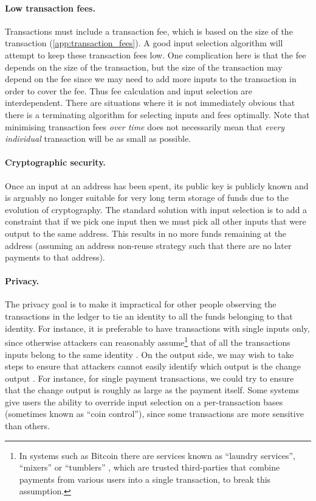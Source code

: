 \documentclass{article}
\theoremstyle{definition}{
  \newtheorem{lemma}{Lemma}[section] %
  \newtheorem{definition}[lemma]{Definition}
}
\theoremstyle{theorem}{
  \newtheorem{invariant}[lemma]{Invariant}
  \newtheorem{proofobligation}[lemma]{Proof Obligation}
}
\numberwithin{equation}{lemma}
\begin{document}
\paragraph{Low transaction fees.}
Transactions must include a transaction fee, which is based on the size of the
transaction (\cref{app:transaction_fees}). A good input selection
algorithm will attempt to keep these transaction fees low. One complication here
is that the fee depends on the size of the transaction, but the size of
the transaction may depend on the fee since we may need to add more inputs to
the transaction in order to cover the fee. Thus fee calculation and input
selection are interdependent. There are situations where it is not immediately
obvious that there is a terminating algorithm for selecting inputs and fees
optimally. Note that minimising transaction fees \emph{over time} does not
necessarily mean that \emph{every individual} transaction will be as small as
possible.

\paragraph{Cryptographic security.}
Once an input at an address has been spent, its public key is publicly
known and is arguably no longer suitable for very long term storage of funds due
to the evolution of cryptography. The standard solution with input selection is
to add a constraint that if we pick one input then we must pick all other inputs
that were output to the same address. This results in no more funds remaining at
the address (assuming an address non-reuse strategy such that there are no later
payments to that address).

\paragraph{Privacy.}
The privacy goal is to make it impractical for other people observing the
transactions in the ledger to tie an identity to all the funds belonging to that
identity. For instance, it is preferable to have transactions with single
inputs only, since otherwise attackers can reasonably assume\footnote{In systems
such as Bitcoin there are services known as ``laundry services'', ``mixers'' or
``tumblers'' \citep{10.1007/978-3-319-70290-2_18}, which are trusted
third-parties that combine payments from various users into a single transaction, to
break this assumption.}  that of all the transactions inputs belong to the same
identity \citep{fergal}. On the output side, we may wish to take steps to ensure
that attackers cannot easily identify which output is the change output
\citep{8260674}. For instance, for single payment transactions, we could try to
ensure that the change output is roughly as large as the payment itself. Some
systems give users the ability to override input selection on a per-transaction
bases (sometimes known as ``coin control''), since some transactions are more
sensitive than others.
\end{document}
